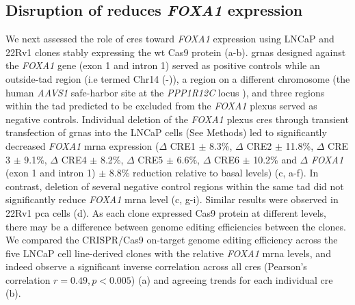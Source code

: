 
\subsection{Disruption of  reduces \emph{FOXA1}  expression}

We next assessed the role of \glspl{cre} toward \emph{FOXA1} expression using LNCaP and 22Rv1 clones stably expressing the \gls{wt} Cas9 protein (a-b).
\Glspl{grna} designed against the \emph{FOXA1} gene (exon 1 and intron 1) served as positive controls while an outside-\gls{tad} region (i.e termed Chr14 (-)), a region on a different chromosome (the human \emph{AAVS1} safe-harbor site at the \emph{PPP1R12C} locus \cite{kronTMPRSS2ERGFusion2017,dekelverFunctionalGenomicsProteomics2010}), and three regions within the \gls{tad} predicted to be excluded from the \emph{FOXA1} plexus served as negative controls.
Individual deletion of the \emph{FOXA1} plexus \glspl{cre} through transient transfection of \glspl{grna} into the LNCaP cells (See Methods) led to significantly decreased \emph{FOXA1} \gls{mrna} expression ($\Delta$ CRE1  $\pm$ 8.3\%, $\Delta$ CRE2  $\pm$ 11.8\%, $\Delta$ CRE 3  $\pm$ 9.1\%, $\Delta$ CRE4  $\pm$ 8.2\%, $\Delta$ CRE5  $\pm$ 6.6\%, $\Delta$ CRE6  $\pm$ 10.2\% and $\Delta$ \emph{FOXA1} (exon 1 and intron 1)  $\pm$ 8.8\% reduction relative to basal levels) (c, a-f).
In contrast, deletion of several negative control regions within the same \gls{tad} did not significantly reduce \emph{FOXA1} \gls{mrna} level (c, g-i).
Similar results were observed in 22Rv1 \gls{pca} cells (d).
As each clone expressed Cas9 protein at different levels, there may be a difference between genome editing efficiencies between the clones.
We compared the CRISPR/Cas9 on-target genome editing efficiency across the five LNCaP cell line-derived clones with the relative \emph{FOXA1} \gls{mrna} levels, and indeed observe a significant inverse correlation across all \glspl{cre} (Pearson's correlation $r = 0.49, p < 0.005$) (a) and agreeing trends for each individual \gls{cre} (b).

